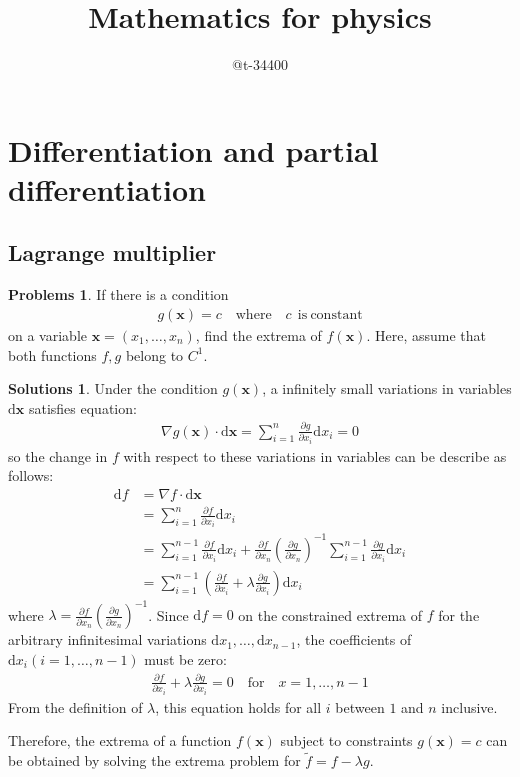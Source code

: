 \documentclass[draft]{article}
\title{Mathematics for physics}
\author{@t-34400}
\theoremstyle{definition}
\newtheorem{problem}{Problems}[section]
\newtheorem{solution}{Solutions}[section]
\newcommand{\dif}{\mathrm{d}}
\newcommand{\pardif}[2]{\frac{\partial #1}{\partial #2}}
\begin{document}
\maketitle

\section{Differentiation and partial differentiation}
\subsection{Lagrange multiplier}

\begin{problem}
    If there is a condition 
    \begin{align}
        g(\bm{x})=c\mathrm{\quad where\quad}c\mathrm{\ \ is\ constant}    
    \end{align}
    on a variable $\bm{x} = (x_1,\ldots, x_n)$, find the extrema of $f(\bm{x})$. Here, assume that both functions $f, g$ belong to $C^1$. 
\end{problem}
\begin{solution}
    Under the condition $g(\bm{x})$, a infinitely small variations in variables $\dif \bm{x}$ satisfies equation:
    \begin{align}
        \nabla g(\bm{x})\cdot\dif\bm{x} = \sum_{i=1}^n\pardif{g}{x_i}\dif x_i = 0        
    \end{align}
    so the change in $f$ with respect to these variations in variables can be describe as follows:
    \begin{align}
        \dif f &= \nabla f\cdot\dif\bm{x}\\
        &=\sum_{i=1}^{n}\pardif{f}{x_i}\dif x_i\\
        &=\sum_{i=1}^{n-1}\pardif{f}{x_i}\dif x_i + \pardif{f}{x_n}\left(\pardif{g}{x_n}\right)^{-1}\sum_{i=1}^{n-1}\pardif{g}{x_i}\dif x_i\\
        &=\sum_{i=1}^{n-1}\left(\pardif{f}{x_i} + \lambda\pardif{g}{x_i}\right)\dif x_i
    \end{align}
    where $\lambda = \pardif{f}{x_n}\left(\pardif{g}{x_n}\right)^{-1}$. Since $\dif f=0$ on the constrained extrema of $f$ for the arbitrary infinitesimal variations $\dif x_1,\ldots ,\dif x_{n-1}$, the coefficients of $\dif x_i (i=1,\ldots, n-1)$ must be zero:
    \begin{align}
        \pardif{f}{x_i} + \lambda\pardif{g}{x_i} = 0\mathrm{\quad for\quad}x=1,\ldots,n-1
    \end{align}
    From the definition of $\lambda$, this equation holds for all $i$ between $1$ and $n$ inclusive.

    Therefore, the extrema of a function $f(\bm{x})$ subject to constraints $g(\bm{x}) = c$ can be obtained by solving the extrema problem for $\tilde{f} = f - \lambda g$.
\end{solution}
\end{document}
